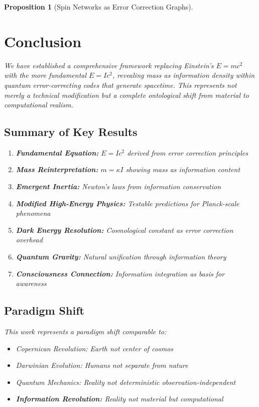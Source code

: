 \documentclass[12pt,a4paper]{article}
\newtheorem{proposition}[theorem]{Proposition}
\theoremstyle{remark}
\begin{document}
\begin{proposition}[Spin Networks as Error Correction Graphs]
\section{Conclusion}
\label{sec:conclusion}

We have established a comprehensive framework replacing Einstein's $E = mc^2$ with the more fundamental $E = Ic^2$, revealing mass as information density within quantum error-correcting codes that generate spacetime. This represents not merely a technical modification but a complete ontological shift from material to computational realism.

\subsection{Summary of Key Results}

\begin{enumerate}
\item \textbf{Fundamental Equation:} $E = Ic^2$ derived from error correction principles
\item \textbf{Mass Reinterpretation:} $m = \kappa I$ showing mass as information content
\item \textbf{Emergent Inertia:} Newton's laws from information conservation
\item \textbf{Modified High-Energy Physics:} Testable predictions for Planck-scale phenomena
\item \textbf{Dark Energy Resolution:} Cosmological constant as error correction overhead
\item \textbf{Quantum Gravity:} Natural unification through information theory
\item \textbf{Consciousness Connection:} Information integration as basis for awareness
\end{enumerate}

\subsection{Paradigm Shift}

This work represents a paradigm shift comparable to:
\begin{itemize}
\item Copernican Revolution: Earth not center of cosmos
\item Darwinian Evolution: Humans not separate from nature
\item Quantum Mechanics: Reality not deterministic observation-independent
\item \textbf{Information Revolution:} Reality not material but computational
\end{itemize}


\end{proposition}
\end{document}
